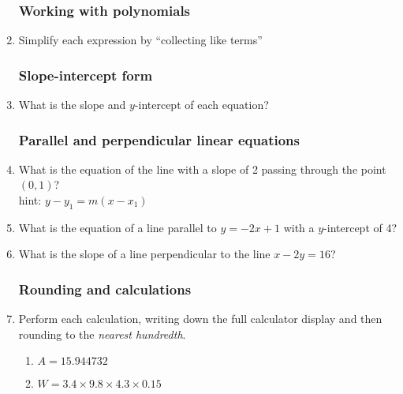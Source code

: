 \begin{enumerate}
\subsubsection*{Working with polynomials}
\item Simplify each expression by ``collecting like terms''
\begin{enumerate}[itemsep=2cm]
    \end{enumerate} \vspace{2cm}
  
  \subsubsection*{Slope-intercept form}
  \item What is the slope and $y$-intercept of each equation?
\begin{enumerate}[itemsep=2cm]
    \end{enumerate} \vspace{1.5cm}

\newpage
\subsubsection*{Parallel and perpendicular linear equations}

  \item What is the equation of the line with a slope of 2 passing through the point $(0,1)$? \\
  hint: $y-y_1=m(x-x_1)$ \vspace{1.5cm}
  \item What is the equation of a line parallel to $y=-2x+1$ with a $y$-intercept of 4? \vspace{1.5cm}
  \item What is the slope of a line perpendicular to the line $x-2y=16$? \vspace{3cm}

\subsubsection*{Rounding and calculations}
\item Perform each calculation, writing down the full calculator display and then rounding to the \emph{nearest hundredth}.
  \begin{multicols}{2}
  \begin{enumerate}[itemsep=2cm]
    \item $A=15.944732$
    \item $W=3.4 \times 9.8 \times 4.3 \times 0.15$
          

\end{enumerate}
\end{multicols}
\end{enumerate}
